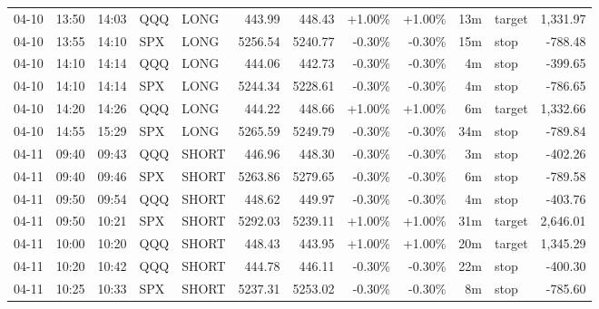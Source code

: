 \documentclass[11pt,a4paper,twoside]{article}
\begin{document}
\begin{center}
\begin{longtable}{>{\color{txtmain}}l l l l l r r r r r >{\color{txtmain}}l r}
04-10 & 13:50 & 14:03 & QQQ & LONG & 443.99 & 448.43 & \textcolor{wingreen}{+1.00\%} & \textcolor{wingreen}{+1.00\%} & 13m & target & \textcolor{wingreen}{1,331.97} \\
04-10 & 13:55 & 14:10 & SPX & LONG & 5256.54 & 5240.77 & \textcolor{lossred}{-0.30\%} & \textcolor{lossred}{-0.30\%} & 15m & stop & \textcolor{lossred}{-788.48} \\
04-10 & 14:10 & 14:14 & QQQ & LONG & 444.06 & 442.73 & \textcolor{lossred}{-0.30\%} & \textcolor{lossred}{-0.30\%} & 4m & stop & \textcolor{lossred}{-399.65} \\
04-10 & 14:10 & 14:14 & SPX & LONG & 5244.34 & 5228.61 & \textcolor{lossred}{-0.30\%} & \textcolor{lossred}{-0.30\%} & 4m & stop & \textcolor{lossred}{-786.65} \\
04-10 & 14:20 & 14:26 & QQQ & LONG & 444.22 & 448.66 & \textcolor{wingreen}{+1.00\%} & \textcolor{wingreen}{+1.00\%} & 6m & target & \textcolor{wingreen}{1,332.66} \\
04-10 & 14:55 & 15:29 & SPX & LONG & 5265.59 & 5249.79 & \textcolor{lossred}{-0.30\%} & \textcolor{lossred}{-0.30\%} & 34m & stop & \textcolor{lossred}{-789.84} \\
04-11 & 09:40 & 09:43 & QQQ & SHORT & 446.96 & 448.30 & \textcolor{lossred}{-0.30\%} & \textcolor{lossred}{-0.30\%} & 3m & stop & \textcolor{lossred}{-402.26} \\
04-11 & 09:40 & 09:46 & SPX & SHORT & 5263.86 & 5279.65 & \textcolor{lossred}{-0.30\%} & \textcolor{lossred}{-0.30\%} & 6m & stop & \textcolor{lossred}{-789.58} \\
04-11 & 09:50 & 09:54 & QQQ & SHORT & 448.62 & 449.97 & \textcolor{lossred}{-0.30\%} & \textcolor{lossred}{-0.30\%} & 4m & stop & \textcolor{lossred}{-403.76} \\
04-11 & 09:50 & 10:21 & SPX & SHORT & 5292.03 & 5239.11 & \textcolor{wingreen}{+1.00\%} & \textcolor{wingreen}{+1.00\%} & 31m & target & \textcolor{wingreen}{2,646.01} \\
04-11 & 10:00 & 10:20 & QQQ & SHORT & 448.43 & 443.95 & \textcolor{wingreen}{+1.00\%} & \textcolor{wingreen}{+1.00\%} & 20m & target & \textcolor{wingreen}{1,345.29} \\
04-11 & 10:20 & 10:42 & QQQ & SHORT & 444.78 & 446.11 & \textcolor{lossred}{-0.30\%} & \textcolor{lossred}{-0.30\%} & 22m & stop & \textcolor{lossred}{-400.30} \\
04-11 & 10:25 & 10:33 & SPX & SHORT & 5237.31 & 5253.02 & \textcolor{lossred}{-0.30\%} & \textcolor{lossred}{-0.30\%} & 8m & stop & \textcolor{lossred}{-785.60} \\

\end{longtable}
\end{center}
\end{document}
